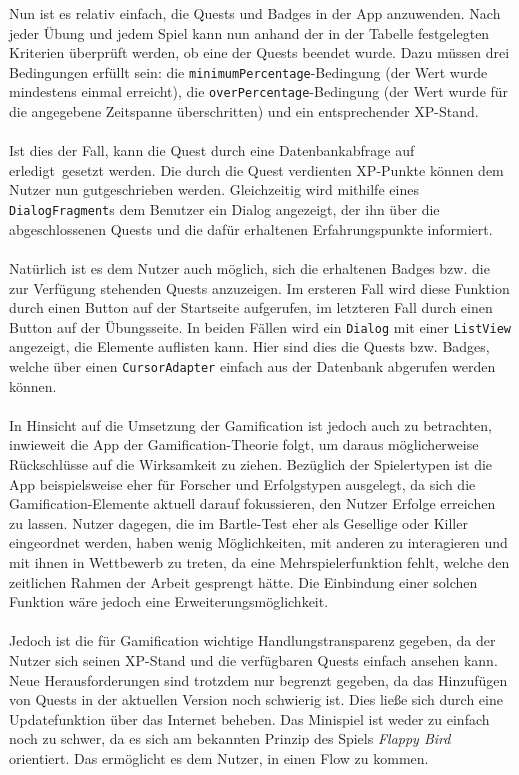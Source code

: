 Nun ist es relativ einfach, die Quests und Badges in der App anzuwenden. Nach jeder Übung und jedem Spiel kann nun anhand der in der Tabelle festgelegten Kriterien überprüft werden, ob eine der Quests beendet wurde. Dazu müssen drei Bedingungen erfüllt sein: die \texttt{minimumPercentage}-Bedingung (der Wert wurde mindestens einmal erreicht), die \texttt{overPercentage}-Bedingung (der Wert wurde für die angegebene Zeitspanne überschritten) und ein entsprechender XP-Stand. \\ \\
Ist dies der Fall, kann die Quest durch eine Datenbankabfrage auf \glqq erledigt\grqq ~gesetzt werden. Die durch die Quest verdienten XP-Punkte können dem Nutzer nun gutgeschrieben werden. Gleichzeitig wird mithilfe eines \texttt{DialogFragment}s dem Benutzer ein Dialog angezeigt, der ihn über die abgeschlossenen Quests und die dafür erhaltenen Erfahrungspunkte informiert. \\ \\
Natürlich ist es dem Nutzer auch möglich, sich die erhaltenen Badges bzw. die zur Verfügung stehenden Quests anzuzeigen. Im ersteren Fall wird diese Funktion durch einen Button auf der Startseite aufgerufen, im letzteren Fall durch einen Button auf der Übungsseite. In beiden Fällen wird ein \texttt{Dialog} mit einer \texttt{ListView} angezeigt, die Elemente auflisten kann. Hier sind dies die Quests bzw. Badges, welche über einen \texttt{CursorAdapter} einfach aus der Datenbank abgerufen werden können. \\ \\
In Hinsicht auf die Umsetzung der Gamification ist jedoch auch zu betrachten, inwieweit die App der Gamification-Theorie folgt, um daraus möglicherweise Rückschlüsse auf die Wirksamkeit zu ziehen. Bezüglich der Spielertypen ist die App beispielsweise eher für Forscher und Erfolgstypen ausgelegt, da sich die Gamification-Elemente aktuell darauf fokussieren, den Nutzer Erfolge erreichen zu lassen. Nutzer dagegen, die im Bartle-Test eher als Gesellige oder Killer eingeordnet werden, haben wenig Möglichkeiten, mit anderen zu interagieren und mit ihnen in Wettbewerb zu treten, da eine Mehrspielerfunktion fehlt, welche den zeitlichen Rahmen der Arbeit gesprengt hätte. Die Einbindung einer solchen Funktion wäre jedoch eine Erweiterungsmöglichkeit. \\ \\
Jedoch ist die für Gamification wichtige Handlungstransparenz gegeben, da der Nutzer sich seinen XP-Stand und die verfügbaren Quests einfach ansehen kann. Neue Herausforderungen sind trotzdem nur begrenzt gegeben, da das Hinzufügen von Quests in der aktuellen Version noch schwierig ist. Dies ließe sich durch eine Updatefunktion über das Internet beheben. Das Minispiel ist weder zu einfach noch zu schwer, da es sich am bekannten Prinzip des Spiels \textit{Flappy Bird} orientiert. Das ermöglicht es dem Nutzer, in einen Flow zu kommen. \\ \\
